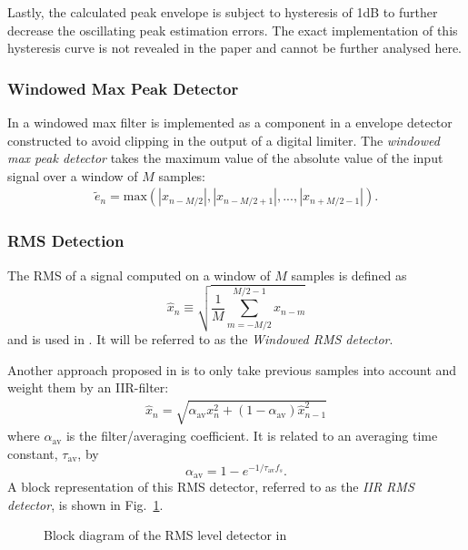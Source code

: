 \documentclass[../main2.tex]{subfiles}
\providecommand{\rootdir}{..}
\begin{document}
Lastly, the calculated peak envelope is subject to hysteresis of 1dB to further decrease the oscillating peak estimation errors. The exact implementation of this hysteresis curve is not revealed in the paper and cannot be further analysed here.

\subsubsection{Windowed Max Peak Detector}
In \cite{hamalainen2002smoothing} a windowed max filter is implemented as a component in a envelope detector constructed to avoid clipping in the output of a digital limiter. The \emph{windowed max peak detector} takes the maximum value of the absolute value of the input signal over a window of $M$ samples:
\begin{align}\label{eq:window_max_det}
\tilde{e}_n = \text{max}(|x_{n-M/2}|,|x_{n-M/2+1}|,..., |x_{n+M/2-1}|).
\end{align}

\subsubsection{RMS Detection}
The RMS of a signal computed on a window of $M$ samples is defined as
\begin{equation}
\hat{x}_n \equiv \sqrt{ \frac{1}{M} \sum_{m=-M/2}^{M/2-1} x_{n-m}}
\end{equation}
and is used in \cite{reiss2010rev, bosi1991low}. It will be referred to as the \emph{Windowed RMS detector}.

Another approach proposed in \cite{mcnally1984dynamic} is to only take previous samples into account and weight them by an IIR-filter:
\begin{align*}
\hat{x}_n = \sqrt{\alpha_{\text{av}} x_{n}^2+ (1-\alpha_{\text{av}}) \hat{x}_{n-1}^2}
\end{align*}
where $\alpha_\text{av}$ is the filter/averaging coefficient. It is related to an averaging time constant, $\tau_\text{av}$, by 
\begin{equation}
\alpha_\text{av} = 1 - e^{-1/\tau_\text{av} f_s } \label{eq:average_coeff_def}.
\end{equation}
A block representation of this RMS detector, referred to as the \emph{IIR RMS detector}, is shown in Fig.~\ref{fig:block_mcnally_theory_rms}.
\begin{figure}[h]
\centerline{}
\caption{Block diagram of the RMS level detector in \cite{mcnally1984dynamic}}
\label{fig:block_mcnally_theory_rms}
\end{figure}
\end{document}

